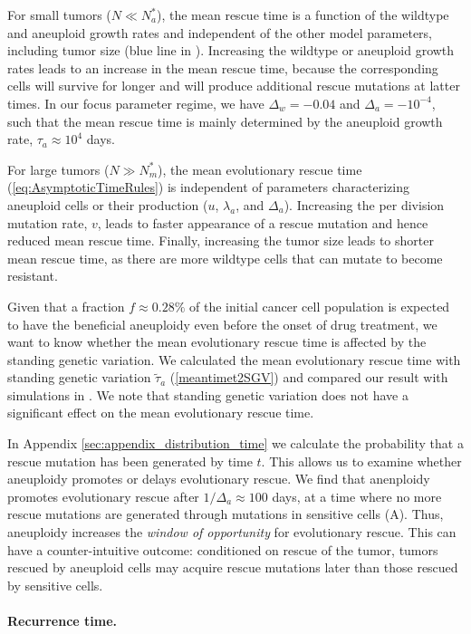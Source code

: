 \documentclass[12pt]{extarticle}
\begin{document}
For small tumors ($ N \ll N_a^*$), the mean rescue time is a function of the wildtype and aneuploid growth rates and independent of the other model parameters, including tumor size (blue line in ).
Increasing the wildtype or aneuploid growth rates leads to an increase in the mean rescue time, because the corresponding cells will survive for longer and will produce additional rescue mutations at latter times.
In our focus parameter regime, we have $\Delta_w=-0.04$ and $\Delta_a=-10^{-4}$, such that the mean rescue time is mainly determined by the aneuploid growth rate, $\tau_a \approx 10^4$ days.

For large tumors ($N \gg N_m^*$), the mean evolutionary rescue time (\cref{eq:AsymptoticTimeRules}) is independent of parameters characterizing aneuploid cells or their production ($u$, $\lambda_a$, and $\Delta_a$). 
Increasing the per division mutation rate, $v$, leads to faster appearance of a rescue mutation and hence reduced mean rescue time. 
Finally, increasing the tumor size leads to shorter mean rescue time, as there are more wildtype cells that can mutate to become resistant. 

Given that a fraction $f\approx 0.28\%$ of the initial cancer cell population is expected to have the beneficial aneuploidy even before the onset of drug treatment, we want to know whether the mean evolutionary rescue time is affected by the standing genetic variation. We calculated the mean evolutionary rescue time with standing genetic variation $\tilde{\tau}_a$ (\cref{meantimet2SGV}) and compared our result with simulations in  . We note that standing genetic variation does not have a significant effect on the mean evolutionary rescue time. 

In Appendix \ref{sec:appendix_distribution_time} we calculate the probability that a rescue mutation has been generated by time $t$. This allows us to examine whether aneuploidy promotes or delays evolutionary rescue. 
We find that anenploidy promotes evolutionary rescue after $1/\Delta_a\approx100$ days, at a time where no more rescue mutations are generated through mutations in sensitive cells (A). Thus, aneuploidy increases the \emph{window of opportunity} for evolutionary rescue. This can have a counter-intuitive outcome: conditioned on rescue of the tumor, tumors rescued by aneuploid cells may acquire rescue mutations later than those rescued by sensitive cells.

\paragraph{Recurrence time.}
\end{document}
